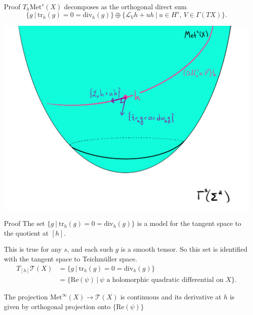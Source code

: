 \documentclass[professionalfont]{beamer}
\begin{document}



\begin{frame}{Proof}
$T_h\mathrm{Met}^s(X)$ decomposes as the orthogonal direct sum 
\[
\{ g \ | \ \mathrm{tr}_h (g) = 0 = \mathrm{div}_h(g) \} \oplus \{\mathcal{L}_V h + u h \ |\ u \in H^s \text{, } V \in \Gamma(TX) \}.
\]  

\centering\includegraphics[scale=0.09]{Tangent-5.jpg}

\end{frame}




\begin{frame}{Proof}
The set $\{ g \ | \ \mathrm{tr}_h (g) = 0 = \mathrm{div}_h(g) \}$ is a model for the tangent space to the quotient at $[h]$. 
\newline

This is true for any $s$, and each such $g$ is a smooth tensor. So this set is identified with the tangent space to Teichm\"uller space.
\begin{align*}
T_{[h]}\mathcal{T}(X)
&= \{ g \ | \ \mathrm{tr}_h (g) = 0 = \mathrm{div}_h(g) \} \\
&= \{ \mathrm{Re}(\psi) \ | \ \psi \text{ a holomorphic quadratic differential on } X \}.
\end{align*} \pause

The projection $\mathrm{Met}^\infty(X) \to \mathcal{T}(X)$ is continuous and its derivative at $h$ is given by orthogonal projection onto $\{ \mathrm{Re}(\psi) \}$




\end{frame}
\end{document}
